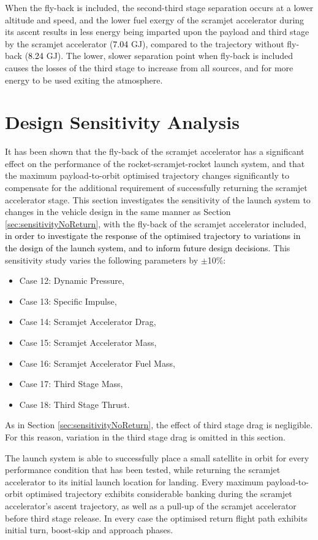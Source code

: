 When the fly-back is included, the second-third stage separation occurs at a lower altitude and speed, and the lower fuel exergy of the scramjet accelerator during its ascent results in less energy being imparted upon the payload and third stage by the scramjet accelerator (\textcolor{black}{7.04} GJ), compared to the trajectory without fly-back (\textcolor{black}{8.24} GJ). 
The lower, slower separation point when fly-back is included causes the losses of the third stage to increase from all sources, and for more energy to be used exiting the atmosphere. 



\section{Design Sensitivity Analysis}\label{sec:sensitivity}

It has been shown that the fly-back of the scramjet accelerator has a significant effect on the performance of the rocket-scramjet-rocket launch system, and that the maximum payload-to-orbit optimised trajectory changes significantly to compensate for the additional requirement of successfully returning the scramjet accelerator stage. This section investigates the sensitivity of the launch system to changes in the vehicle design in the same manner as Section \ref{sec:sensitivityNoReturn}, with the fly-back of the scramjet accelerator included, \textcolor{black}{in order to investigate the response of the optimised trajectory to variations in the design of the launch system, and to inform future design decisions.} This sensitivity study varies the following parameters by $\pm$10\%:
\begin{itemize}
	\item Case 12: Dynamic Pressure, 
	\item Case 13: Specific Impulse,
	\item Case 14: Scramjet Accelerator Drag,
	\item Case 15: Scramjet Accelerator Mass,
	\item Case 16: Scramjet Accelerator Fuel Mass,
	\item Case 17: Third Stage Mass,
	\item Case 18: Third Stage Thrust.
\end{itemize}
As in Section \ref{sec:sensitivityNoReturn}, the effect of third stage drag is negligible. For this reason, variation in the third stage drag is omitted in this section. 

The launch system is able to successfully place a small satellite in orbit for every performance condition that has been tested, while returning the scramjet accelerator to its initial launch location for landing. 
Every maximum payload-to-orbit optimised trajectory exhibits considerable banking during the scramjet accelerator's ascent trajectory, as well as a pull-up of the scramjet accelerator before third stage release. 
In every case the optimised return flight path exhibits initial turn, boost-skip and approach phases. 




